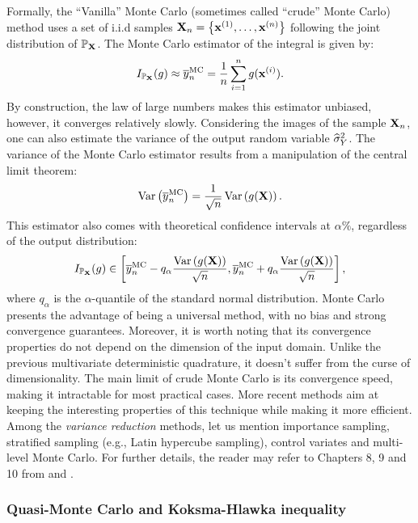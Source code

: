 Formally, the ``Vanilla'' Monte Carlo (sometimes called ``crude'' Monte Carlo) method uses a set of i.i.d samples ${\bf X}_n = \left\{{\bf x}^{(1)}, \dots, {\bf x}^{(n)}\right\}$ following the joint distribution of $\mathbb{P}_{{\bf X}}$. 
The Monte Carlo estimator of the integral is given by: 
\begin{equation}
    I_{\mathbb{P}_{{\bf X}}}(g) \approx \overline{y}_n^{\textrm{MC}} = \frac1n \sum_{i=1}^{n} g({\bf x}^{(i)}).
\end{equation}
By construction, the law of large numbers makes this estimator unbiased, however, it converges relatively slowly. 
Considering the images of the sample ${\bf X}_n$, one can also estimate the variance of the output random variable $\widehat{\sigma}^2_Y$.
The variance of the Monte Carlo estimator results from a manipulation of the central limit theorem:
\begin{equation}
    \operatorname{Var}\left(\overline{y}_n^{\textrm{MC}}\right) = \frac{1}{\sqrt{n}} \operatorname{Var}\left(g({\bf X})\right). 
    \label{eq:MC_variance}
\end{equation}
This estimator also comes with theoretical confidence intervals at $\alpha \%$, regardless of the output distribution: 
\begin{equation}
    I_{\mathbb{P}_{{\bf X}}}(g) \in \left[\overline{y}_n^{\textrm{MC}}  - q_\alpha \frac{\operatorname{Var}\left(g({\bf X})\right)}{\sqrt{n}}, \overline{y}_n^{\textrm{MC}}  + q_\alpha \frac{\operatorname{Var}\left(g({\bf X})\right)}{\sqrt{n}} \right],
    \label{eq:MC_IC}
\end{equation}
where $q_\alpha$ is the $\alpha$-quantile of the standard normal distribution. 
Monte Carlo presents the advantage of being a universal method, with no bias and strong convergence guarantees. 
Moreover, it is worth noting that its convergence properties do not depend on the dimension of the input domain. 
Unlike the previous multivariate deterministic quadrature, it doesn't suffer from the curse of dimensionality. 
The main limit of crude Monte Carlo is its convergence speed, making it intractable for most practical cases. 
More recent methods aim at keeping the interesting properties of this technique while making it more efficient. 
Among the \textit{variance reduction} methods, let us mention importance sampling, stratified sampling (e.g., Latin hypercube sampling), control variates and multi-level Monte Carlo. 
For further details, the reader may refer to Chapters 8, 9 and 10 from \citet{owen_2013} and \citep{giles_2008}.


\subsubsection{Quasi-Monte Carlo and Koksma-Hlawka inequality}

